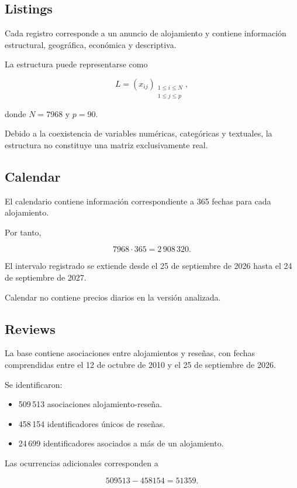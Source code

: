 \documentclass[11pt,a4paper]{article}
\begin{document}
\subsection{Listings}

Cada registro corresponde a un anuncio de alojamiento
y contiene información estructural, geográfica,
económica y descriptiva.

La estructura puede representarse como

\[
L=(x_{ij})_{\substack{
1\leq i\leq N\\
1\leq j\leq p}},
\]

donde $N=7968$ y $p=90$.

Debido a la coexistencia de variables numéricas,
categóricas y textuales, la estructura no constituye
una matriz exclusivamente real.

\subsection{Calendar}

El calendario contiene información correspondiente
a 365 fechas para cada alojamiento.

Por tanto,

\[
7968\cdot365=2\,908\,320.
\]

El intervalo registrado se extiende desde el
25 de septiembre de 2026 hasta el
24 de septiembre de 2027.

Calendar no contiene precios diarios en la versión
analizada.

\subsection{Reviews}

La base contiene asociaciones entre alojamientos
y reseñas, con fechas comprendidas entre el
12 de octubre de 2010 y el 25 de septiembre de 2026.

Se identificaron:

\begin{itemize}
    \item 509\,513 asociaciones alojamiento-reseña.
    \item 458\,154 identificadores únicos de reseñas.
    \item 24\,699 identificadores asociados a más
    de un alojamiento.
\end{itemize}

Las ocurrencias adicionales corresponden a

\[
509513-458154=51359.
\]
\end{document}
